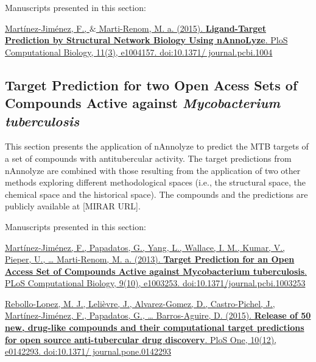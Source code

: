 \documentclass[11pt, b5paper,twoside]{tesi_upf}
\begin{document}
\par Manuscripts presented in this section: 
\begin{tcolorbox}

\href{http://journals.plos.org/ploscompbiol/article?id=10.1371\%2Fjournal.pcbi.1004157}{Martínez-Jiménez, F., $\&$ Marti-Renom, M. a. (2015). \textbf{Ligand-Target Prediction by Structural Network Biology Using nAnnoLyze}. PloS Computational Biology, 11(3), e1004157. doi:10.1371/ journal.pcbi.1004}

\end{tcolorbox}


\clearpage

\subsection{Target Prediction for two Open Acess Sets of Compounds Active against \textit{Mycobacterium tuberculosis}}\label{mtb_results}

\par This section presents the application of nAnnolyze to predict the MTB targets of a set of compounds with antitubercular activity. The target predictions from nAnnolyze are combined with those resulting from the application of two other methods exploring different methodological spaces (i.e., the structural space, the chemical space and the historical space). The compounds and the predictions are publicly available at [MIRAR URL]. \hfill

Manuscripts presented in this section:
\vspace*{10mm}
 \begin{tcolorbox}

\href{http://journals.plos.org/ploscompbiol/article?id=10.1371\%2Fjournal.pcbi.1003253}{Martínez-Jiménez, F., Papadatos, G., Yang, L., Wallace, I. M., Kumar, V., Pieper, U., … Marti-Renom, M. a. (2013). \textbf{Target Prediction for an Open Access Set of Compounds Active against Mycobacterium tuberculosis}. PLoS Computational Biology, 9(10), e1003253. doi:10.1371/journal.pcbi.1003253}
\hfill
\vspace*{7mm}

\href{http://journals.plos.org/plosone/article?id=10.1371/journal.pone.0142293}{Rebollo-Lopez, M. J., Lelièvre, J., Alvarez-Gomez, D., Castro-Pichel, J., Martínez-Jiménez, F., Papadatos, G., … Barros-Aguire, D. (2015). \textbf{Release of 50 new, drug-like compounds and their computational target predictions for open source anti-tubercular drug discovery}. PloS One, 10(12), e0142293. doi:10.1371/ journal.pone.0142293}

\end{tcolorbox}
\end{document}
